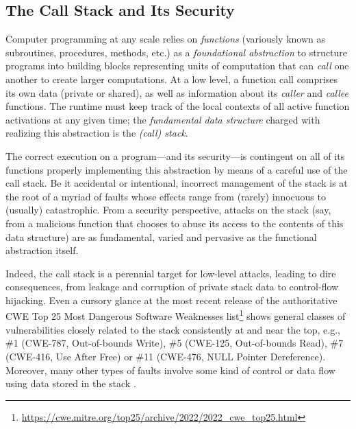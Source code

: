 \subsection{The Call Stack and Its Security}

Computer programming at any scale relies on \emph{functions} (variously known as
subroutines, procedures, methods, etc.) as a \emph{foundational abstraction} to
structure programs into building blocks representing units of computation that
can \emph{call} one another to create larger computations.
%
At a low level, a function call comprises its own data (private or shared), as
well as information about its \emph{caller} and \emph{callee} functions. The
runtime must keep track of the local contexts of all active function activations
at any given time; the \emph{fundamental data structure} charged with realizing
this abstraction is the \emph{(call) stack}.
%

The correct execution on a program---and its security---is contingent on all of
its functions properly implementing this abstraction by means of a careful use
of the call stack. Be it accidental or intentional, incorrect management of the
stack is at the root of a myriad of faults whose effects range from (rarely)
innocuous to (usually) catastrophic.
%
From a security perspective, attacks on the stack (say, from a malicious
function that chooses to abuse its access to the contents of this data
structure) are as fundamental, varied and pervasive as the functional
abstraction itself.
%


Indeed, the call stack is a perennial target for low-level attacks, leading to
dire consequences, from leakage and corruption of private stack data
to control-flow hijacking.
%
Even a cursory glance at the most recent release of the authoritative CWE Top 25
Most Dangerous Software Weaknesses
list\footnote{\url{https://cwe.mitre.org/top25/archive/2022/2022_cwe_top25.html}}
shows general classes of vulnerabilities closely related to the stack 
consistently at and near the top, e.g., \#1 (CWE-787, Out-of-bounds Write), \#5 (CWE-125, Out-of-bounds Read), \#7 (CWE-416, Use
After Free) or \#11 (CWE-476, NULL Pointer Dereference).
%
Moreover, many other types of faults involve some kind of control or data flow
using data stored in the stack .

